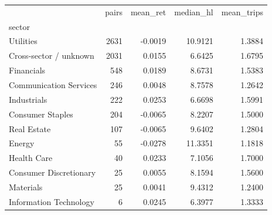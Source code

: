 \begin{tabular}{lrrrr}
\toprule
 & pairs & mean_ret & median_hl & mean_trips \\
sector &  &  &  &  \\
\midrule
Utilities & 2631 & -0.0019 & 10.9121 & 1.3884 \\
Cross-sector / unknown & 2031 & 0.0155 & 6.6425 & 1.6795 \\
Financials & 548 & 0.0189 & 8.6731 & 1.5383 \\
Communication Services & 246 & 0.0048 & 8.7578 & 1.2642 \\
Industrials & 222 & 0.0253 & 6.6698 & 1.5991 \\
Consumer Staples & 204 & -0.0065 & 8.2207 & 1.5000 \\
Real Estate & 107 & -0.0065 & 9.6402 & 1.2804 \\
Energy & 55 & -0.0278 & 11.3351 & 1.1818 \\
Health Care & 40 & 0.0233 & 7.1056 & 1.7000 \\
Consumer Discretionary & 25 & 0.0055 & 8.1594 & 1.5600 \\
Materials & 25 & 0.0041 & 9.4312 & 1.2400 \\
Information Technology & 6 & 0.0245 & 6.3977 & 1.3333 \\
\bottomrule
\end{tabular}
